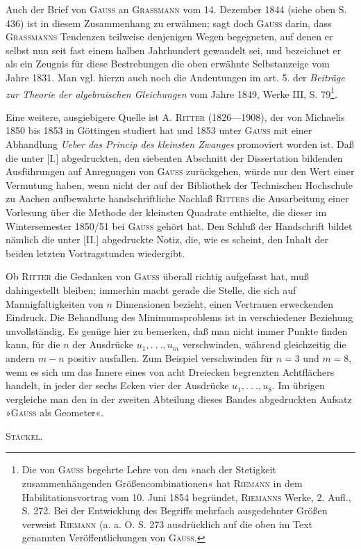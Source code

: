 \indent Auch der Brief von \textsc{Gauss} an \textsc{Grassmann} vom 14. Dezember 1844 (siehe oben S. 436) ist in diesem Zusammenhang zu erwähnen; sagt doch \textsc{Gauss} darin, dass \textsc{Grassmanns} Tendenzen teilweise denjenigen Wegen begegneten, auf denen er selbst nun seit fast einem halben Jahrhundert gewandelt sei, und bezeichnet er als ein Zeugnis für diese Bestrebungen die oben erwähnte Selbstanzeige vom Jahre 1831. Man vgl. hierzu auch noch die Andeutungen im art. 5. der \textit{Beiträge zur Theorie der algebraischen Gleichungen} vom Jahre 1849, Werke III, S. 79\footnote{Die von \textsc{Gauss} begehrte Lehre von den »nach der Stetigkeit zusammenhängenden Größencombinationen« hat \textsc{Riemann} in dem Habilitationsvortrag vom 10. Juni 1854 begründet, \textsc{Riemanns} Werke, 2. Aufl., S. 272. Bei der Entwicklung des Begriffs mehrfach ausgedehnter Größen verweist \textsc{Riemann} (a. a. O. S. 273 ausdrücklich auf die oben im Text genannten Veröffentlichungen von \textsc{Gauss}.}.

\indent Eine weitere, ausgiebigere Quelle ist A. \textsc{Ritter} (1826—1908), der von Michaelis 1850 bis 1853 in Göttingen studiert hat und 1853 unter \textsc{Gauss} mit einer Abhandlung \textit{Ueber das Princip des kleinsten Zwanges} promoviert worden ist. Daß die unter [I.] abgedruckten, den siebenten Abschnitt der Dissertation bildenden Ausführungen auf Anregungen von \textsc{Gauss} zurückgehen, würde nur den Wert einer Vermutung haben, wenn nicht der auf der Bibliothek der Technischen Hochschule zu Aachen aufbewahrte handschriftliche Nachlaß \textsc{Ritters} die Ausarbeitung einer Vorlesung über die Methode der kleinsten Quadrate enthielte, die dieser im Wintersemester 1850/51 bei \textsc{Gauss} gehört hat. Den Schluß der Handschrift bildet nämlich die unter [II.] abgedruckte Notiz, die, wie es scheint, den Inhalt der beiden letzten Vortragstunden wiedergibt.

\indent Ob \textsc{Ritter} die Gedanken von \textsc{Gauss} überall richtig aufgefasst hat, muß dahingestellt bleiben; immerhin macht gerade die Stelle, die sich auf Mannigfaltigkeiten von \(n\) Dimensionen bezieht, einen Vertrauen erweckenden Eindruck. Die Behandlung des Minimumsproblems ist in verschiedener Beziehung unvollständig. Es genüge hier zu bemerken, daß man nicht immer Punkte finden kann, für die \(n\) der Ausdrücke \(u_1,.\ .\ .,u_m\) verschwinden, während gleichzeitig die andern \(m-n\) positiv ausfallen. Zum Beispiel verschwinden für \(n=3\) und \(m=8\), wenn es sich um das Innere eines von acht Dreiecken begrenzten Achtflächers handelt, in jeder der sechs Ecken vier der Ausdrücke \(u_1,.\ .\ .,u_8\). Im übrigen vergleiche man den in der zweiten Abteilung dieses Bandes abgedruckten Aufsatz »\textsc{Gauss} als Geometer«.
\par\noindent\hfill\textsc{Stäckel}.
\ClosingRule
\endgroup
